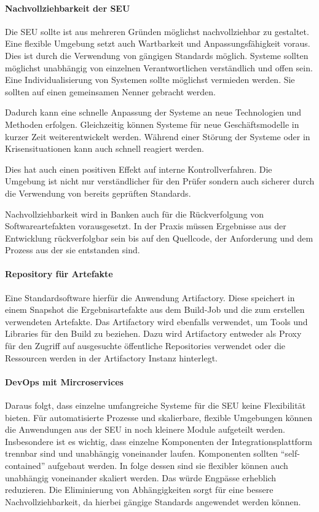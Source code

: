 \paragraph{Nachvollziehbarkeit der SEU}
Die \ac{SEU} sollte ist aus mehreren Gründen möglichst nachvollziehbar zu gestaltet. Eine flexible Umgebung setzt auch Wartbarkeit und Anpassungsfähigkeit voraus. Dies ist durch die Verwendung von gängigen Standards möglich. Systeme sollten möglichst unabhängig von einzelnen Verantwortlichen verständlich und offen sein. Eine Individualisierung von Systemen sollte möglichst vermieden werden. Sie sollten auf einen gemeinsamen Nenner gebracht werden.

Dadurch kann eine schnelle Anpassung der Systeme an neue Technologien und Methoden erfolgen. Gleichzeitig können Systeme für neue Geschäftsmodelle in kurzer Zeit weiterentwickelt werden. Während einer Störung der Systeme oder in Krisensituationen kann auch schnell reagiert werden.

Dies hat auch einen positiven Effekt auf interne Kontrollverfahren. Die Umgebung ist nicht nur verständlicher für den Prüfer sondern auch sicherer durch die Verwendung von bereits geprüften Standards.

Nachvollziehbarkeit wird in Banken auch für die Rückverfolgung von Softwareartefakten vorausgesetzt. In der Praxis müssen Ergebnisse aus der Entwicklung rückverfolgbar sein bis auf den Quellcode, der Anforderung und dem Prozess aus der sie entstanden sind.

\paragraph{Repository für Artefakte}
Eine Standardsoftware hierfür die Anwendung Artifactory. Diese speichert in einem Snapshot die Ergebnisartefakte aus dem Build-Job und die zum erstellen verwendeten Artefakte. Das Artifactory wird ebenfalls verwendet, um Tools und Libraries für den Build zu beziehen. Dazu wird Artifactory entweder als Proxy für den Zugriff auf ausgesuchte öffentliche Repositories verwendet oder die Ressourcen werden in der Artifactory Instanz hinterlegt.

\paragraph{DevOps mit Mircroservices}
Daraus folgt, dass einzelne umfangreiche Systeme für die \ac{SEU} keine Flexibilität bieten. Für automatisierte Prozesse und skalierbare, flexible Umgebungen können die Anwendungen aus der \ac{SEU} in noch kleinere Module aufgeteilt werden. Insbesondere ist es wichtig, dass einzelne Komponenten der Integrationsplattform trennbar sind und unabhängig voneinander laufen. Komponenten sollten \enquote{self-contained} aufgebaut werden. In folge dessen sind sie flexibler können auch unabhängig voneinander skaliert werden. Das würde Engpässe erheblich reduzieren. Die Eliminierung von Abhängigkeiten sorgt für eine bessere Nachvollziehbarkeit, da hierbei gängige Standards angewendet werden können.

